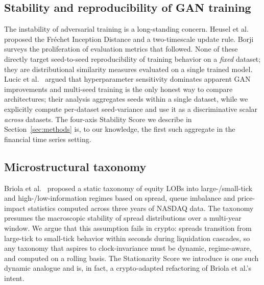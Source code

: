 \subsection*{Stability and reproducibility of GAN training}
The instability of adversarial training is a long-standing concern.
Heusel et al.~\cite{heusel2017fid} proposed the Fr\'echet Inception
Distance and a two-timescale update rule.
Borji~\cite{borji2022pros} surveys the proliferation of evaluation
metrics that followed. None of these directly target seed-to-seed
reproducibility of training behavior on a \emph{fixed} dataset; they
are distributional similarity measures evaluated on a single trained
model. Lucic et al.~\cite{lucic2018gans} argued that hyperparameter
sensitivity dominates apparent GAN improvements and multi-seed
training is the only honest way to compare architectures; their
analysis aggregates seeds within a single dataset, while we explicitly
compute per-dataset seed-variance and use it as a discriminative
scalar \emph{across} datasets. The four-axis Stability Score we
describe in Section~\ref{sec:methods} is, to our knowledge, the first
such aggregate in the financial time series setting.

\subsection*{Microstructural taxonomy}
Briola et al.~\cite{briola2024} proposed a static taxonomy of equity
LOBs into large-/small-tick and high-/low-information regimes based on
spread, queue imbalance and price-impact statistics computed across
three years of NASDAQ data. The taxonomy presumes the macroscopic
stability of spread distributions over a multi-year window. We argue
that this assumption fails in crypto: spreads transition from
large-tick to small-tick behavior within seconds during liquidation
cascades, so any taxonomy that aspires to clock-invariance must be
dynamic, regime-aware, and computed on a rolling basis. The
Stationarity Score we introduce is one such dynamic analogue and is,
in fact, a crypto-adapted refactoring of Briola et al.'s intent.

